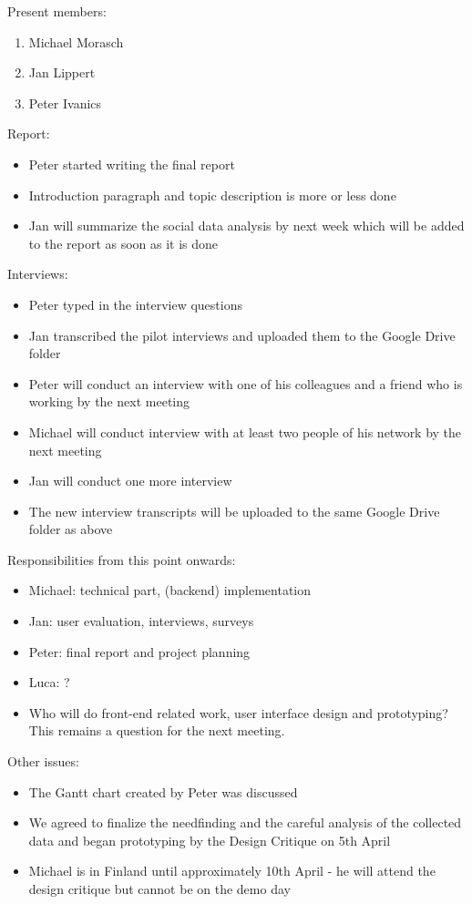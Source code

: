 Present members: 
\begin{enumerate}
\item Michael Morasch
\item Jan Lippert
\item Peter Ivanics
\end{enumerate}

Report: 
\begin{itemize}
\item Peter started writing the final report
\item Introduction paragraph and topic description is more or less done
\item Jan will summarize the social data analysis by next week which will be added to the report as soon as it is done
\end{itemize}

Interviews:
\begin{itemize}
\item Peter typed in the interview questions
\item Jan transcribed the pilot interviews and uploaded them to the Google Drive folder 
\item Peter will conduct an interview with one of his colleagues and a friend who is working by the next meeting
\item Michael will conduct interview with at least two people of his network by the next meeting
\item Jan will conduct one more interview
\item The new interview transcripts will be uploaded to the same Google Drive folder as above 
\end{itemize}

Responsibilities from this point onwards: 
\begin{itemize}
\item Michael: technical part, (backend) implementation
\item Jan: user evaluation, interviews, surveys
\item Peter: final report and project planning
\item Luca: ?
\item Who will do front-end related work, user interface design and prototyping? This remains a question for the next meeting.
\end{itemize}

Other issues: 
\begin{itemize}
\item The Gantt chart created by Peter was discussed
\item We agreed to finalize the needfinding and the careful analysis of the collected data and began prototyping by the Design Critique on 5th April 
\item Michael is in Finland until approximately 10th April - he will attend the design critique but cannot be on the demo day
\end{itemize}

